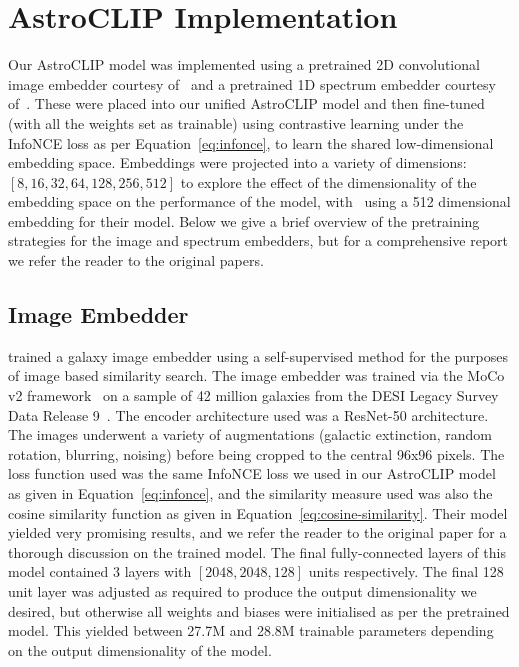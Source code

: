
\section{AstroCLIP Implementation}\label{sec:astroclip-implementation}
Our AstroCLIP model was implemented using a pretrained 2D convolutional image embedder courtesy of~\cite{stein2021}
and a pretrained 1D spectrum embedder courtesy of~\cite{liang2023}.
These were placed into our unified AstroCLIP model and then fine-tuned (with all the weights set as trainable) using
contrastive learning under the InfoNCE loss as per Equation~\eqref{eq:infonce}, to learn the shared low-dimensional
embedding space.
Embeddings were projected into a variety of dimensions: $[8, 16, 32, 64, 128, 256, 512]$ to explore the effect of the
dimensionality of the embedding space on the performance of the model, with~\cite{astroclip} using a 512 dimensional
embedding for their model.
Below we give a brief overview of the pretraining strategies for the image and spectrum embedders, but for a
comprehensive report we refer the reader to the original papers.

\subsection{Image Embedder}\label{subsec:image-embedder}
\cite{stein2021} trained a galaxy image embedder using a self-supervised method for the purposes of image based similarity search.
The image embedder was trained via the MoCo v2 framework~\citep{moco2020, mocov22020} on a sample of 42 million galaxies
from the DESI Legacy Survey Data Release 9~\citep{desilegacy2018}.
The encoder architecture used was a ResNet-50 architecture.
The images underwent a variety of augmentations (galactic extinction, random rotation, blurring, noising) before
being cropped to the central 96x96 pixels.
The loss function used was the same InfoNCE loss we used in our AstroCLIP model as given in Equation~\eqref{eq:infonce},
and the similarity measure used was also the cosine similarity function as given in Equation~\eqref{eq:cosine-similarity}.
Their model yielded very promising results, and we refer the reader to the original paper for a thorough discussion
on the trained model.
The final fully-connected layers of this model contained 3 layers with $[2048, 2048, 128]$ units respectively.
The final 128 unit layer was adjusted as required to produce the output dimensionality we desired, but otherwise all
weights and biases were initialised as per the pretrained model.
This yielded between 27.7M and 28.8M trainable parameters depending on the output dimensionality of the model.


